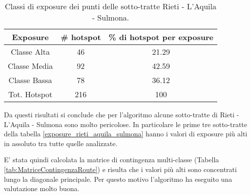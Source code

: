 \begin{table}[H]
	\centering
	\begin{tabular}{|c|c|c|}
		\hline
		\rowcolor[HTML]{C0C0C0} 
		\textbf{Exposure} & \textbf{\# hotspot} & \textbf{\% di hotspot per exposure} \\ \hline
		Classe Alta       & 46                  & 21.29                                   \\ \hline
		Classe Media      & 92                 & 42.59                         \\ \hline
		Classe Bassa      & 78              & 36.12                            \\ \hline
		Tot. Hotspot      & 216               & 100                                 \\ \hline
	\end{tabular}
	\caption{Classi di exposure dei punti delle sotto-tratte Rieti - L'Aquila - Sulmona.}
	\label{risultati_rieti_aquila_sulmona}
\end{table}
Da questi risultati si conclude che per l'algoritmo alcune sotto-tratte di Rieti - L'Aquila - Sulmona sono molto pericolose.
In particolare le prime tre sotto-tratte della tabella \ref{exposure_rieti_aquila_sulmona} hanno i valori di exposure più alti in assoluto tra tutte quelle analizzate. 

E' stata quindi calcolata la matrice di contingenza multi-classe (Tabella \ref{tab:MatriceContingenzaRoute}) e risulta che i valori più alti sono concentrati lungo la diagonale principale. Per questo motivo l'algoritmo ha eseguito una valutazione molto buona.

